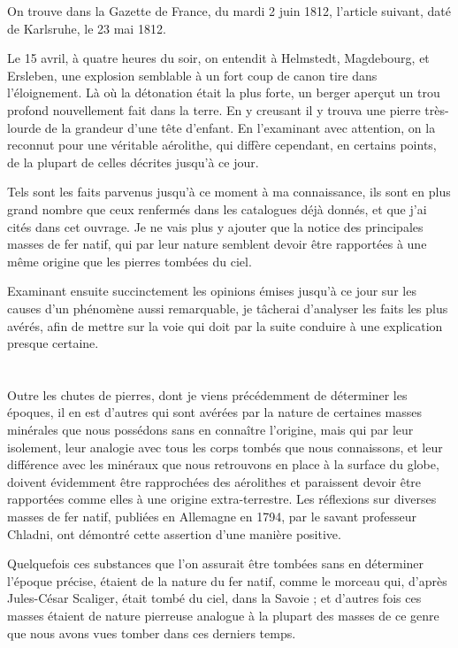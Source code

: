 \documentclass[a4paper, 12pt, oneside, french]{article}
\begin{document}
On trouve dans la Gazette de France, du mardi 2 juin 1812, l'article suivant, daté de Karlsruhe, le 23 mai 1812.

\og Le 15 avril, à quatre heures du soir, on entendit à Helmstedt, Magdebourg, et Ersleben, une explosion semblable à un fort coup de canon tire dans l'éloignement. Là où la détonation était la plus forte, un berger aperçut un trou profond nouvellement fait dans la terre. En y creusant il y trouva une pierre très-lourde de la grandeur d'une tête d'enfant. En l'examinant avec attention, on la reconnut pour une véritable aérolithe, qui diffère cependant, en certains points, de la plupart de celles décrites jusqu'à ce jour. \fg

Tels sont les faits parvenus jusqu'à ce moment à ma connaissance, ils sont en plus grand nombre que ceux renfermés dans les catalogues déjà donnés, et que j'ai cités dans cet ouvrage. Je ne vais plus y ajouter que la notice des principales masses de fer natif, qui par leur nature semblent devoir être rapportées à une même origine que les pierres tombées du ciel.

Examinant ensuite succinctement les opinions émises jusqu'à ce jour sur les causes d'un phénomène aussi remarquable, je tâcherai d'analyser les faits les plus avérés, afin de mettre sur la voie qui doit par la suite conduire à une explication presque certaine.
\clearpage
\section{}
\paragraph{}
Outre les chutes de pierres, dont je viens précédemment de déterminer les époques, il en est d'autres qui sont avérées par la nature de certaines masses minérales que nous possédons sans en connaître l'origine, mais qui par leur isolement, leur analogie avec tous les corps tombés que nous connaissons, et leur différence avec les minéraux que nous retrouvons en place à la surface du globe, doivent évidemment être rapprochées des aérolithes et paraissent devoir être rapportées comme elles à une origine extra-terrestre. Les réflexions sur diverses masses de fer natif, publiées en Allemagne en 1794, par le savant professeur Chladni, ont démontré cette assertion d'une manière positive.

Quelquefois ces substances que l'on assurait être tombées sans en déterminer l'époque précise, étaient de la nature du fer natif, comme le morceau qui, d'après Jules-César Scaliger, était tombé du ciel, dans la Savoie ; et d'autres fois ces masses étaient de nature pierreuse analogue à la plupart des masses de ce genre que nous avons vues tomber dans ces derniers temps.
\end{document}

